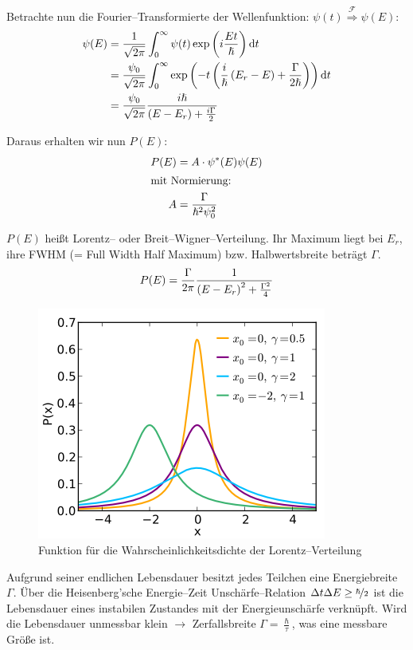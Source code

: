 \documentclass[Ex4_Zusammenfassung.tex]{subfiles}
\begin{document}
Betrachte nun die Fourier--Transformierte der Wellenfunktion: $\psi(t) \stackrel{\mathcal{F}}{\Rightarrow} \psi(E)$:
\begin{align}
	\psi(E) &= \frac{1}{\sqrt{2 \pi}} \int_{0}^{\infty} \psi (t) \exp \left( i \frac{E t}{\hslash}  \right) \mathrm{d} t\\
	&= \frac{\psi_0}{\sqrt{2 \pi}} \int_{0}^{\infty} \exp \left( -t \left( \frac{i}{\hslash} \left( E_r  - E \right) + \frac{\Gamma}{2 \hslash} \right) \right) \mathrm{d} t \\
	&= \frac{\psi_0}{\sqrt{2 \pi}} \frac{i \hslash}{\left( E - E_r \right) + \frac{i \Gamma}{2}}
\end{align}

Daraus erhalten wir nun $P(E)$:
\begin{align}
	P(E) &= A \cdot \psi^*(E) \psi(E)\\
	\intertext{mit Normierung:}
	A &= \frac{\Gamma}{\hslash^2 \psi_0^2}
\end{align}

$P(E)$ heißt Lorentz-- oder Breit--Wigner--Verteilung. Ihr Maximum liegt bei $E_r$, ihre FWHM (= Full Width Half Maximum) bzw. Halbwertsbreite beträgt $\Gamma$.
\begin{equation}
	P(E) = \frac{\Gamma}{2 \pi} \frac{1}{\left( E - E_r  \right)^2 + \frac{\Gamma^2}{4}}
\end{equation}
\begin{figure}[H]
	\centering
	\includegraphics[scale=0.8]{Cauchy_pdf.png}
	\caption{Funktion für die Wahrscheinlichkeitsdichte der Lorentz--Verteilung}
\end{figure}

Aufgrund seiner endlichen Lebensdauer besitzt jedes Teilchen eine Energiebreite $\Gamma$. Über die Heisenberg'sche Energie--Zeit Unschärfe--Relation $\Delta t \Delta E \ge \nicefrac{\hslash}{2}$ ist die Lebensdauer eines instabilen Zustandes mit der Energieunschärfe verknüpft. Wird die Lebensdauer unmessbar klein $\rightarrow$ Zerfallsbreite $\Gamma = \frac{\hslash}{\tau}$, was eine messbare Größe ist.\\
\end{document}

